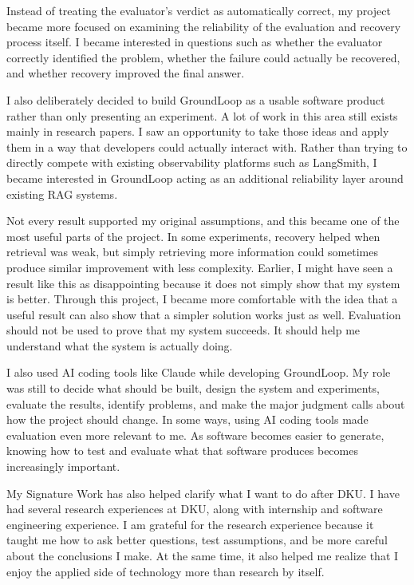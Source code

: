 \documentclass[12pt, a4paper, oneside]{report}
\begin{document}
Instead of treating the evaluator's verdict as automatically correct, my project became more focused on examining the reliability of the evaluation and recovery process itself. I became interested in questions such as whether the evaluator correctly identified the problem, whether the failure could actually be recovered, and whether recovery improved the final answer.

I also deliberately decided to build GroundLoop as a usable software product rather than only presenting an experiment. A lot of work in this area still exists mainly in research papers. I saw an opportunity to take those ideas and apply them in a way that developers could actually interact with. Rather than trying to directly compete with existing observability platforms such as LangSmith, I became interested in GroundLoop acting as an additional reliability layer around existing RAG systems.

Not every result supported my original assumptions, and this became one of the most useful parts of the project. In some experiments, recovery helped when retrieval was weak, but simply retrieving more information could sometimes produce similar improvement with less complexity. Earlier, I might have seen a result like this as disappointing because it does not simply show that my system is better. Through this project, I became more comfortable with the idea that a useful result can also show that a simpler solution works just as well. Evaluation should not be used to prove that my system succeeds. It should help me understand what the system is actually doing.

I also used AI coding tools like Claude while developing GroundLoop. My role was still to decide what should be built, design the system and experiments, evaluate the results, identify problems, and make the major judgment calls about how the project should change. In some ways, using AI coding tools made evaluation even more relevant to me. As software becomes easier to generate, knowing how to test and evaluate what that software produces becomes increasingly important.

My Signature Work has also helped clarify what I want to do after DKU. I have had several research experiences at DKU, along with internship and software engineering experience. I am grateful for the research experience because it taught me how to ask better questions, test assumptions, and be more careful about the conclusions I make. At the same time, it also helped me realize that I enjoy the applied side of technology more than research by itself.
\end{document}
